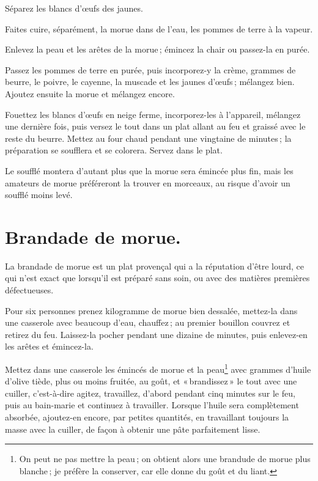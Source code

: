 Séparez les blancs d'œufs des jaunes.

Faites cuire, séparément, la morue dans de l'eau, les pommes de terre à la
vapeur.

Enlevez la peau et les arêtes de la morue ; émincez la chair ou passez-la en
purée.

Passez les pommes de terre en purée, puis incorporez-y la crème, {\mmm}
grammes de beurre, le poivre, le cayenne, la muscade et les jaunes d'œufs ;
mélangez bien. Ajoutez ensuite la morue et mélangez encore.

Fouettez les blancs d'œufs en neige ferme, incorporez-les à l'appareil,
mélangez une dernière fois, puis versez le tout dans un plat allant au feu et
graissé avec le reste du beurre. Mettez au four chaud pendant une vingtaine de
minutes ; la préparation se soufflera et se colorera. Servez dans le plat.

Le soufflé montera d'autant plus que la morue sera émincée plus fin, mais les
amateurs de morue préféreront la trouver en morceaux, au risque d'avoir un
soufflé moins levé.

\section*{\centering Brandade de morue.}

La brandade de morue est un plat provençal qui a la réputation d'être lourd, ce
qui n'est exact que lorsqu'il est préparé sans soin, ou avec des matières
premières défectueuses.

Pour six personnes prenez {\mmm} kilogramme de morue bien dessalée,
mettez-la dans une casserole avec beaucoup d'eau, chauffez ; au premier
bouillon couvrez et retirez du feu. Laissez-la pocher pendant une dizaine de
minutes, puis enlevez-en les arêtes et émincez-la.

Mettez dans une casserole les émincés de morue et la peau\footnote{On peut ne
pas mettre la peau ; on obtient alors une brandude de morue plus blanche ; je
préfère la conserver, car elle donne du goût et du liant.} avec {\mmm}
grammes d'huile d'olive tiède, plus ou moins fruitée, au goût, et
« brandissez » le tout avec une cuiller, c'est-à-dire agitez, travaillez,
d'abord pendant cinq minutes sur le feu, puis au bain-marie et continuez
à travailler. Lorsque l'huile sera complètement absorbée, ajoutez-en encore,
par petites quantités, en travaillant toujours la masse avec la cuiller, de
façon à obtenir une pâte parfaitement lisse.

